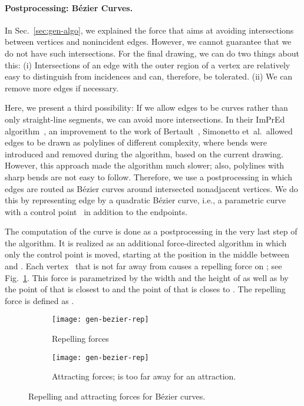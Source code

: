 \documentclass[]{llncs}
\begin{document}
\paragraph{Postprocessing: B\'ezier Curves.}
In Sec.~\ref{sec:gen-algo}, we explained the force that
aims at avoiding intersections between vertices and nonincident edges.
However, we cannot guarantee that we do not have such intersections.
For the final drawing, we can do two things about this: (i)
Intersections of an edge with the outer region of a vertex are
relatively easy to distinguish from incidences and can, therefore, be
tolerated. (ii) We can remove more edges if necessary.

Here, we present a third possibility: If we allow edges to be curves
rather than only straight-line segments, we can avoid more
intersections.
In their ImPrEd algorithm~\cite{Simonetto2011}, an improvement to the
work of Bertault~\cite{Bertault2000}, Simonetto et~al.\ allowed edges
to be drawn as polylines of different complexity, where bends were
introduced and removed during the algorithm, based on the current
drawing. However, this approach made the algorithm much slower; also,
polylines with sharp bends are not easy to follow. Therefore, we
use a postprocessing in which edges are routed as B\'ezier curves
around intersected nonadjacent vertices.
We do this by representing edge  by a
quadratic B\'ezier curve, i.e., a parametric curve with a control
point~ in addition to the endpoints.

The computation of the curve is done as a postprocessing in the very
last step of the algorithm. It is realized as an additional
force-directed algorithm in which only the control point is moved,
starting at the position in the middle between  and . Each
vertex~ that is not far away from  causes a repelling force on
; see Fig.~\ref{fig:gen-bezier-rep}. This force is parametrized by
the width  and the height  of  as well as by the point
 of  that is closest to  and the point  of
 that is closes to . The repelling force is defined as
.
\begin{figure}[tb]
	\begin{subfigure}[t]{.38\textwidth}
		\centering
		\texttt{[image: gen-bezier-rep]}
		\caption{Repelling forces}
		\label{fig:gen-bezier-rep}
	\end{subfigure}
	\hfill
	\begin{subfigure}[t]{.58\textwidth}
		\centering
		\texttt{[image: gen-bezier-rep]}
		\caption{Attracting forces;  is too far away for an
		attraction.}
		\label{fig:gen-bezier-attr}
	\end{subfigure}
	\caption{Repelling and attracting forces for B\'ezier curves.}
	\label{fig:gen}
\end{figure}
\end{document}
